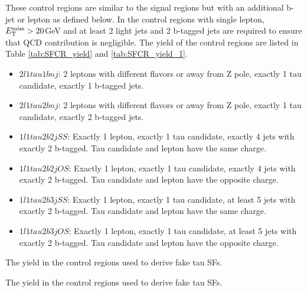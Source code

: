 These control regions are similar to the signal regions but with an additional b-jet or lepton as defined below. In the control regions with single lepton, $E_{\text{T}}^{\text{miss}} > 20$GeV and at least 2 light jets and 2 b-tagged jets are required to ensure that QCD contribution is negligible. The yield of the control regions are listed in Table \ref{tab:SFCR_yield} and \ref{tab:SFCR_yield_1}.

\begin{itemize}
\item{$2l1tau1bnj$: 2 leptons with different flavors or away from Z pole, exactly 1 tau candidate,  exactly 1 b-tagged jets.}
\item{$2l1tau2bnj$: 2 leptons with different flavors or away from Z pole, exactly 1 tau candidate,  exactly 2 b-tagged jets.}
\item{$1l1tau2b2j SS$: Exactly 1 lepton, exactly 1 tau candidate, exactly 4 jets with exactly 2 b-tagged. Tau candidate and lepton have the same charge.}
\item{$1l1tau2b2j OS$: Exactly 1 lepton, exactly 1 tau candidate, exactly 4 jets with exactly 2 b-tagged. Tau candidate and lepton have the opposite charge.}
\item{$1l1tau2b3j SS$: Exactly 1 lepton, exactly 1 tau candidate, at least 5 jets with exactly 2 b-tagged. Tau candidate and lepton have the same charge.}
\item{$1l1tau2b3j OS$: Exactly 1 lepton, exactly 1 tau candidate, at least 5 jets with exactly 2 b-tagged. Tau candidate and lepton have the opposite charge.}
\end{itemize}


\begin{table}
\caption{The yield in the control regions used to derive fake tau SFs.}
\label{tab:SFCR_yield}

\end{table}
\begin{table}
\caption{The yield in the control regions used to derive fake tau SFs.}
\label{tab:SFCR_yield_1}

\end{table}

